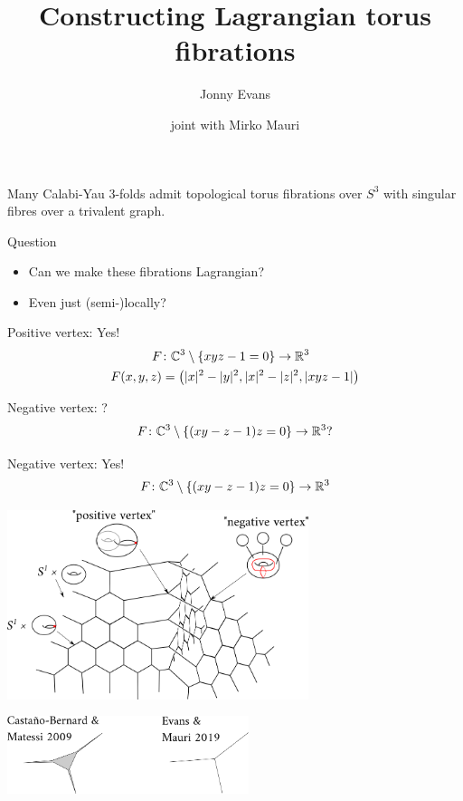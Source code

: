 \documentclass{beamer}
\title{Constructing Lagrangian torus fibrations}
\author{Jonny Evans}
\date{joint with Mirko Mauri}
\begin{document}
\maketitle
\begin{frame}
\begin{overprint}
\begin{Theorem}[Gross 1999]\label{thm:gross}
Many Calabi-Yau 3-folds admit topological torus
fibrations over \(S^3\) with singular fibres over a
trivalent graph.
\end{Theorem}
\begin{block}{Question}
\begin{itemize}
\item Can we make these fibrations Lagrangian?
\item Even just (semi-)locally?
\end{itemize}
\end{block}
\begin{block}{Positive vertex: Yes!}
\begin{align*}
F&\colon\mathbb{C}^3\setminus\{xyz-1=0\}\to\mathbb{R}^3\\
F(x,y,z)&=\left(|x|^2-|y|^2,|x|^2-|z|^2,|xyz-1|\right)
\end{align*}
\end{block}
\begin{block}{Negative vertex: ?}
\[F\colon\mathbb{C}^3\setminus\{(xy-z-1)z=0\}\to\mathbb{R}^3?\]
\end{block}
\begin{block}{Negative vertex: Yes!}
\[F\colon\mathbb{C}^3\setminus\{(xy-z-1)z=0\}\to\mathbb{R}^3\]
\end{block}


\end{overprint}
\begin{overprint}
\begin{center}
\includegraphics[width=250pt]{discriminant}
\end{center}
\begin{center}
\includegraphics[width=200pt]{theorems}


\end{center}
\end{overprint}
\end{frame}
\end{document}
